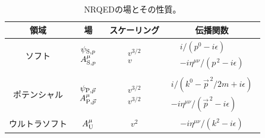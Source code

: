 \begin{table}[t!]
  \begin{center}
    \caption{NRQEDの場とその性質。}
    \label{tab: NRQED}
    \vspace{.4cm}
    \begin{tabular}{cccc}
    	\toprule
      \textbf{領域} & \textbf{場} & \textbf{スケーリング} & \textbf{伝播関数} \\
      	\midrule
      ソフト & $\begin{array}{c}
      		\psi_{{\rm S},  p} \\
      		A_{{\rm S}, p}^\mu 
      	\end{array}$ \vspace{.2cm} & $\begin{array}{l}
      		v^{3/2} \\
      		v 
      	\end{array}$ & $\begin{array}{c}
      		 i /(p^0 - i \epsilon) \\
      		-i \eta^{\mu\nu} / (p^{\, 2} - i \epsilon)
      	\end{array}$ \\
      	\midrule
      ポテンシャル & $\begin{array}{c}
      		\psi_{{\rm P}, \vec p} \\
      		A_{{\rm P}, \vec p}^\mu 
      	\end{array}$ \vspace{.2cm} & $\begin{array}{l}
      		v^{3/2} \\
      		v^{3/2}
      	\end{array}$ & $\begin{array}{c}
      		 i /(k^0 - \vec{p}^{\, 2}/2m + i \epsilon) \\
      		-i \eta^{\mu\nu} / (\vec{p}^{\, 2}  - i \epsilon)
      	\end{array}$ \\
      	\midrule
      ウルトラソフト & $A_{{\rm U}}^\mu$ & $\!\!\!\! v^2$ & $-i \eta^{\mu\nu}/(k^2-i\epsilon)$ \\
      \bottomrule
    \end{tabular}
  \end{center}
\end{table}

